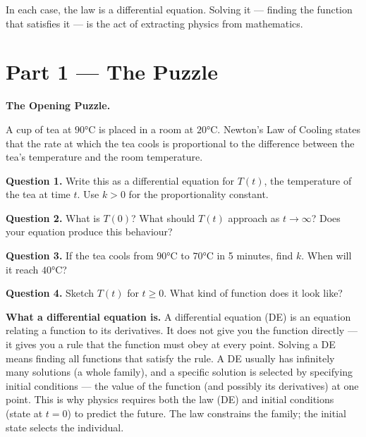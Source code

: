 \documentclass[12pt, a4paper]{article}
\begin{document}
\medskip
In each case, the law is a differential equation. Solving it --- finding the function that satisfies it --- is the act of extracting physics from mathematics.

\newpage

\section{Part 1 \texorpdfstring{---}{--} The Puzzle}

\begin{puzzlebox}
\textbf{The Opening Puzzle.}

A cup of tea at $90°\text{C}$ is placed in a room at $20°\text{C}$. Newton's Law of Cooling states that the rate at which the tea cools is proportional to the difference between the tea's temperature and the room temperature.

\medskip
\textbf{Question 1.} Write this as a differential equation for $T(t)$, the temperature of the tea at time $t$. Use $k > 0$ for the proportionality constant.

\textbf{Question 2.} What is $T(0)$? What should $T(t)$ approach as $t \to \infty$? Does your equation produce this behaviour?

\textbf{Question 3.} If the tea cools from $90°\text{C}$ to $70°\text{C}$ in 5 minutes, find $k$. When will it reach $40°\text{C}$?

\textbf{Question 4.} Sketch $T(t)$ for $t \geq 0$. What kind of function does it look like?
\end{puzzlebox}

\begin{thought}
\textbf{What a differential equation is.}
A differential equation (DE) is an equation relating a function to its derivatives. It does not give you the function directly --- it gives you a rule that the function must obey at every point. Solving a DE means finding all functions that satisfy the rule. A DE usually has infinitely many solutions (a whole family), and a specific solution is selected by specifying initial conditions --- the value of the function (and possibly its derivatives) at one point. This is why physics requires both the law (DE) and initial conditions (state at $t=0$) to predict the future. The law constrains the family; the initial state selects the individual.
\end{thought}
\end{document}
